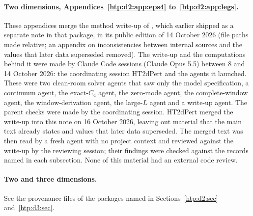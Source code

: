 \paragraph{Two dimensions, Appendices~\ref{htp:d2:app:eps4} to~\ref{htp:d2:app:legs}.} These appendices merge the method
write-up of , which earlier shipped as a separate note in that package, in its
public edition of 14 October 2026 (file paths made relative; an appendix on inconsistencies between internal sources and
the values that later data superseded removed). The
write-up and the computations behind it were made by Claude Code sessions (Claude Opus 5.5) between 8 and 14 October 2026:
the coordinating session HT2dPert and the agents it launched. These were two clean-room solver agents that saw only the
model specification, a continuum agent, the exact-$C_4$ agent, the zero-mode agent, the complete-window agent, the
window-derivation agent, the large-$L$ agent and a write-up agent. The parent checks were made by the coordinating
session. HT2dPert merged the write-up into this note on 16 October 2026, leaving out material that the main text already
states and values that later data superseded. The merged text was then read by a fresh agent with no project context
and reviewed against the write-up by the reviewing session; their findings were checked against the records named in
each subsection. None of this material had an external code review.

\paragraph{Two and three dimensions.} See the provenance files of the packages named in Sections~\ref{htp:d2:sec}
and~\ref{htp:d3:sec}.
